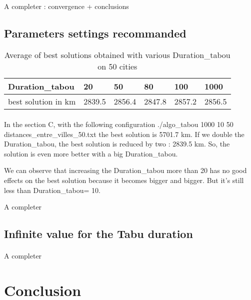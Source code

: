 \documentclass[12pt,oneside,a4paper]{article}
\begin{document}
\paragraph{}
A completer : convergence + conclusions

\newpage
\subsection{Parameters settings recommanded}
\begin{table}[h]
    \centering
    \small
    \begin{tabular}{llllll}
      \hline
      \multicolumn{1}{|l|}{\textbf{Duration\_tabou}}& \multicolumn{1}{l|}{\textbf{20}} & \multicolumn{1}{l|}{\textbf{50}} & \multicolumn{1}{l|}{\textbf{80}} & \multicolumn{1}{l|}{\textbf{100}} & \multicolumn{1}{l|}{\textbf{1000}}\\ \hline
      \multicolumn{1}{|l|}{best solution in km } & \multicolumn{1}{l|}{2839.5}  & \multicolumn{1}{l|}{2856.4}  & \multicolumn{1}{l|}{2847.8}   & \multicolumn{1}{l|}{2857.2}  & \multicolumn{1}{l|}{2856.5} \\ \hline
    \end{tabular}
    \caption{Average of best solutions obtained with various Duration\_tabou on 50 cities}
  \end{table}
\paragraph{}
    In the section C, with the following configuration ./algo\_tabou  1000 10 50 distances\_entre\_villes\_50.txt the best solution is 5701.7 km. 
    If we double the Duration\_tabou, the best solution is reduced by two :  2839.5 km.
    So, the solution is even more better with a big Duration\_tabou. 

    We can observe that increasing the Duration\_tabou more than 20 has no good effects on the best solution because it becomes bigger and bigger. 
    But it’s still less than Duration\_tabou= 10. 

    A completer

\subsection{Infinite value for the Tabu duration}
\paragraph{}
    A completer
\section{Conclusion}
\paragraph{}
\end{document}
